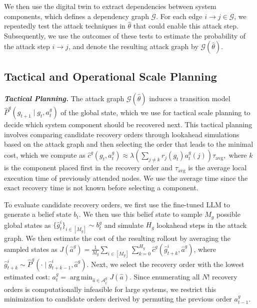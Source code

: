 \documentclass[runningheads,10pt]{llncs}
\DeclareMathOperator*{\argmin}{arg\,min}
\begin{document}
We then use the digital twin to extract dependencies between system components, which defines a dependency graph $\mathcal{G}$. For each edge $i\rightarrow j\in \mathcal{G}$, we repeatedly test the attack techniques in $\hat{\theta}$ that could enable this attack step. Subsequently, we use the outcomes of these tests to estimate the probability of the attack step $i\rightarrow j$, and denote the resulting attack graph by $\mathcal{G}(\hat{\theta})$.

\subsection{Tactical and Operational Scale Planning}
\noindent\textit{\textbf{Tactical Planning.}} The attack graph $\mathcal{G}(\hat{\theta})$ induces a transition model $\hat{P}^g(g_{t+1} \mid g_t, a^g_t)$ of the global state, which we use for tactical scale planning to decide which system component should be recovered next. This tactical planning involves comparing candidate recovery orders through lookahead simulations based on the attack graph and then selecting the order that leads to the minimal cost, which we compute as 
$\hat{c}^g(g_t, a^g_t) \approx \lambda \left(\sum_{j\neq k}r_j(g_t)a^g_t(j)\right)\tau_{\text{avg}},$
where $k$ is the component placed first in the recovery order and $\tau_\text{avg}$ is the average local execution time of previously attended nodes. We use the average time since the exact recovery time is not known before selecting a component.

To evaluate candidate recovery orders, we first use the fine-tuned LLM to generate a belief state $b_t$. We then use this belief state to sample $M_g$ possible global states as $\{\hat{g}^i_t\}_{i \in [M_g]} \sim b^g_t$ and simulate $H_g$ lookahead steps in the attack graph. We then estimate the cost of the resulting rollout by averaging the sampled states as $J(\hat{a}^g) = \frac{1}{M_g}\sum_{i \in [M_g]}\sum_{k=0}^{H_g}\hat{c}^g(\hat{g}^i_{t+k}, \hat{a}^g)$, where $\hat{g}^i_{t+k}\sim\hat P^g(\cdot\mid \hat g^i_{t+k-1}, \hat a^g)$.
Next, we select the recovery order with the lowest estimated cost:
$
a^g_t = \argmin_{\hat{a} \in \mathcal{A}_t^g}J(\hat{a}).
$
Since enumerating all $N!$ recovery orders is computationally infeasible for large systems, we restrict this minimization to candidate orders derived by permuting the previous order $a^g_{t-1}$.
\end{document}
